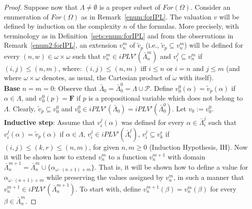 \documentclass[12pt]{article}
\newcommand{\bF}{\mathbf{F}}
\begin{document}
\begin{proof}
Suppose now that $\Lambda \neq \emptyset $ is a proper subset of $For(\Omega)$.
Consider  an enumeration of $For(\Omega)$ as in Remark~\ref{enum:forIPL}.
The valuation $v$ will be defined by induction on the complexity $n$ of the formulas. More precisely, with terminology as in Definition~\ref{sets:enum:forIPL} and from the observations in Remark~\ref{enum2:forIPL}, an extension $v_n^m$ of $\tilde v_p$ (i.e.,  $\tilde v_p \subseteq v_n^m$) will be defined for every $(n,w) \in \omega\times \omega$ such that $v_n^m \in iPLV'(\bar{\Lambda}_n^m)$ and $v_i^j \subseteq v_n^{m}$ if $(i,j) \leq (n,m)$, where: $(i,j) \leq (n,m)$ iff $i \leq n$ or $i=n$ and $j \leq m$ (and where $\omega \times \omega$ denotes, as usual, the Cartesian product of $\omega$ with itself). \\[1mm]
%
{\bf Base} $n=m=0$: Observe that $\bar{\Lambda}_0=\bar{\Lambda}_0^0=\Lambda \cup \mathcal{P}$.
Define $v_0^0(\alpha)= \tilde v_p(\alpha)$ if $\alpha \in \Lambda$, and $v_0^0(p)=\bF$ if $p$ is a propositional variable which does not belong to $\Lambda$. Clearly, $\tilde v_p \subseteq v_0^0$ and $v_0^0 \in iPLV'(\bar{\Lambda}_0)=iPLV'(\bar{\Lambda}_0^0)$. Let $v_0:=v_0^0$.\\[1mm]
%
{\bf Inductive step}: Assume that $v_i^j(\alpha)$ was defined for every $\alpha \in \bar{\Lambda}_i^j$ such that  $v_i^j(\alpha)= \tilde v_p(\alpha)$ if $\alpha \in \Lambda$, $v_i^j \in iPLV'(\bar{\Lambda}_i^j)$, $v_i^j \subseteq v_k^r$ if $(i,j) \leq (k,r) \leq (n,m)$, for given $n,m \geq 0$ (Induction Hypothesis, IH). Now it will be shown how to extend $v_n^m$ to a function $v_n^{m+1}$ with domain $\bar{\Lambda}_n^{m+1}=\bar{\Lambda}_n^m \cup \{\alpha_{\omega\cdot (n+1) +m}\}$. That is, it will be shown how to define a value for $\alpha_{\omega\cdot (n+1) +m}$ while preserving the values assigned by $v_n^m$, in such a manner that $v_n^{m+1}\in iPLV'(\bar{\Lambda}_n^{m+1})$. To start with, define $v_n^{m+1}(\beta)=v_n^m(\beta)$ for every $\beta \in \bar{\Lambda}_n^m$.


\end{proof}
\end{document}
